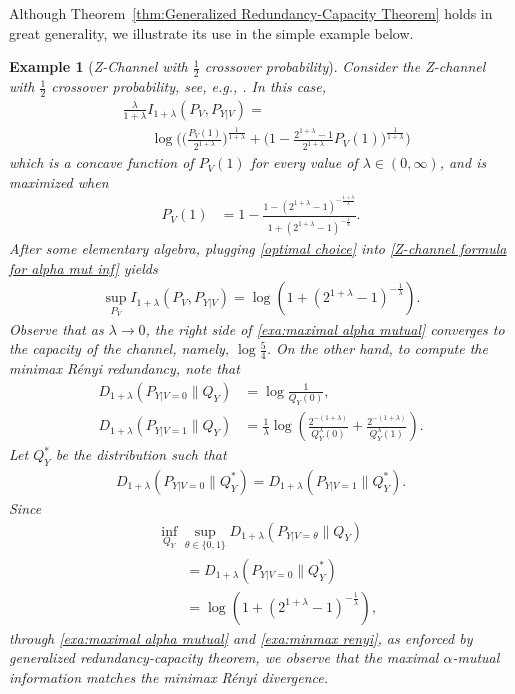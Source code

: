 \documentclass[journal, 10pt]{IEEEtran}
\theoremstyle{plain}
\theoremstyle{plain}
\theoremstyle{plain}
\theoremstyle{plain}
\newtheorem*{exa*}{Example}%
\begin{document}
Although Theorem~\ref{thm:Generalized Redundancy-Capacity Theorem} holds in great generality, we illustrate its use in the simple example below. 
\begin{exa*}[\textit{\textsf{\small Z-Channel with $\frac12$ crossover probability}}] \normalfont
Consider the \emph{Z-channel} with $\frac12$ crossover probability, see, e.g., \cite[Problem 7.8]{CoverThomas}. In this case,
\begin{align}
	&\frac{\lambda}{1+\lambda} I_{1+\lambda}(P_V, P_{Y|V}) = \label{Z-channel formula for alpha mut inf} \\	
	&\qquad  \log \Bigg(\bigg(\frac{P_V(1)}{2^{1+\lambda}}\bigg)^{\frac{1}{1+\lambda}}+ \bigg(1-\frac{2^{1+\lambda} -1}{2^{1+\lambda}}P_V(1)\bigg)^{\frac1{1+\lambda}} \Bigg)  \nonumber
\end{align}
which is a concave function of $P_{V}(1)$ for every value of $\lambda\in (0,\infty) $, and is maximized when 
\begin{align}
	P_{V}(1) &=1- \frac{1-(2^{1+\lambda}-1)^{-\frac{1+\lambda}{\lambda}}}{1+(2^{1+\lambda}-1)^{-\frac{1}{\lambda}}} \text{.} \label{optimal choice}
\end{align}
After some elementary algebra, plugging \eqref{optimal choice} into \eqref{Z-channel formula for alpha mut inf} yields
\begin{align}
	\sup_{P_{V}} I_{1+\lambda}(P_V, P_{Y|V}) = \log\left(1+\left(2^{1+\lambda}-1\right)^{-\frac{1}{\lambda}}\right) \text{.} \label{exa:maximal alpha mutual}
\end{align}
Observe that as $\lambda \to 0$, the right side of \eqref{exa:maximal alpha mutual} converges to the capacity of the channel, namely, $\log \frac54$. 
On the other hand, to compute the minimax R\'enyi redundancy, note that 
\begin{align}
	D_{1+\lambda}(P_{Y|V=0}\|Q_Y) &= \log \frac{1}{Q_Y(0)} \text{,} \\
	D_{1+\lambda}(P_{Y|V=1}\|Q_Y) &= \frac1\lambda \log \left(\frac{2^{-(1+\lambda)}}{Q^\lambda_Y(0)}+\frac{2^{-(1+\lambda)}}{Q^\lambda_Y(1)}\right) \text{.}
\end{align}
Let $Q^\ast_Y$ be the distribution such that 
\begin{align}
	D_{1+\lambda}(P_{Y|V=0}\|Q^\ast_Y) = D_{1+\lambda}(P_{Y|V=1}\|Q^\ast_Y) \text{.}
\end{align}
Since
\begin{align}
	& \inf_{Q_Y}\sup_{\theta \in \{0,1\}} D_{1+\lambda}(P_{Y|V=\theta}\|Q_Y) \nonumber \\ 
	&\qquad = D_{1+\lambda}(P_{Y|V=0}\|Q^\ast_Y) \\ 
	&\qquad = \log\left(1+\left(2^{1+\lambda}-1\right)^{-\frac{1}{\lambda}}\right) \text{,} \label{exa:minmax renyi} 
\end{align}
through \eqref{exa:maximal alpha mutual} and \eqref{exa:minmax renyi}, as enforced by generalized redundancy-capacity theorem, we observe that the maximal $\alpha$-mutual information matches the minimax R\'enyi divergence. 
\end{exa*}
\end{document}
